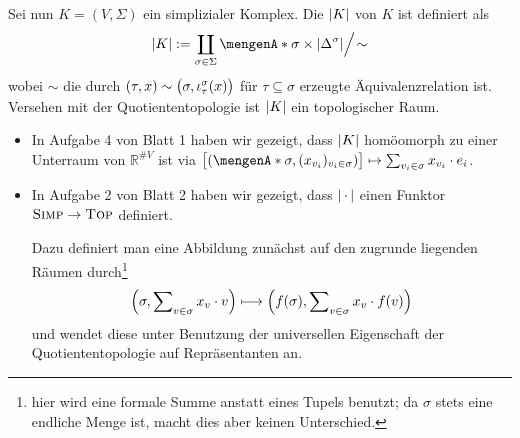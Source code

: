 \noindent Sei nun $K=(V, \Sigma)$ ein simplizialer Komplex. Die  $\abs*{K}$ von $K$ ist definiert als 
\[
	\abs*{K} := \coprod_{\sigma \in \Sigma} \set{\sigma} \times \abs*{\Delta^\sigma} \Big/ \!\sim
\] 
wobei $\sim$ die durch $(\tau, x) \sim \enbrace[\big]{\sigma, \iota_\tau^\sigma(x)}$ für $\tau \subseteq \sigma$ erzeugte Äquivalenzrelation ist. 
Versehen mit der Quotiententopologie ist $\abs*{K}$ ein topologischer Raum. 
\begin{itemize}
	\item In Aufgabe 4 von Blatt 1 haben wir gezeigt, dass $\abs*{K}$ homöomorph zu einer Unterraum von
	$\mathds{R}^{\# V}$ ist via $\benbrace[\big]{\enbrace*{\set{\sigma}, (x_{v_i})_{v_i \in \sigma} } } \mapsto \sum_{v_i \in \sigma} x_{v_i} \cdot e_i$.
	\item In Aufgabe 2 von Blatt 2 haben wir gezeigt, dass $\abs*{\,\cdot\,} $ einen Funktor $\SIMP \to \TOP$ definiert.
	
	Dazu definiert man eine Abbildung zunächst auf den zugrunde liegenden Räumen durch\footnote{hier wird eine formale Summe anstatt eines Tupels benutzt; da $\sigma$ stets 
	eine endliche Menge ist, macht dies aber keinen Unterschied.}
	\[
		\enbrace*{\sigma, \sum\nolimits_{v \in \sigma} x_v \cdot v} \longmapsto \enbrace*{f(\sigma), \sum\nolimits_{v \in \sigma} x_v \cdot f(v)} 
	\]
	und wendet diese unter Benutzung der universellen Eigenschaft der Quotiententopologie auf Repräsentanten an.
\end{itemize}


